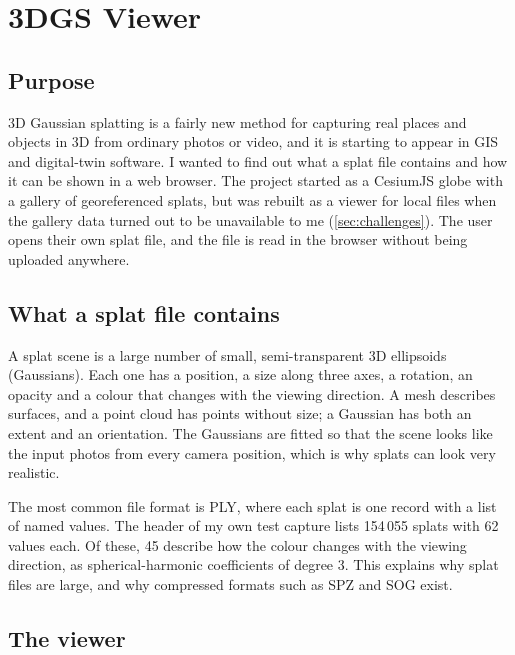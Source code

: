 \section{3DGS Viewer}\label{sec:p3}

\subsection{Purpose}

3D Gaussian splatting \citep{kerbl2023} is a fairly new method for capturing real places and objects in 3D from ordinary photos or video, and it is starting to appear in GIS and digital-twin software. I wanted to find out what a splat file contains and how it can be shown in a web browser. The project started as a CesiumJS globe with a gallery of georeferenced splats, but was rebuilt as a viewer for local files when the gallery data turned out to be unavailable to me (\cref{sec:challenges}). The user opens their own splat file, and the file is read in the browser without being uploaded anywhere.

\subsection{What a splat file contains}

A splat scene is a large number of small, semi-transparent 3D ellipsoids (Gaussians). Each one has a position, a size along three axes, a rotation, an opacity and a colour that changes with the viewing direction. A mesh describes surfaces, and a point cloud has points without size; a Gaussian has both an extent and an orientation. The Gaussians are fitted so that the scene looks like the input photos from every camera position, which is why splats can look very realistic.

The most common file format is PLY, where each splat is one record with a list of named values. The header of my own test capture lists 154\,055 splats with 62 values each. Of these, 45 describe how the colour changes with the viewing direction, as spherical-harmonic coefficients of degree 3. This explains why splat files are large, and why compressed formats such as SPZ \citep{spz} and SOG \citep{playcanvas-sog} exist.

\subsection{The viewer}

